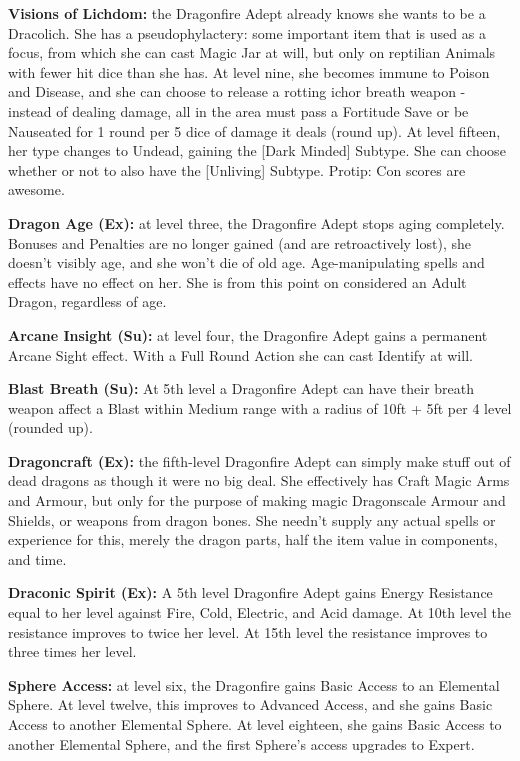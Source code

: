 \begin{itemize*}
\item \textbf{Visions of Lichdom:} the Dragonfire Adept already knows she wants to be a Dracolich. She has a pseudophylactery: some important item that is used as a focus, from which she can cast Magic Jar at will, but only on reptilian Animals with fewer hit dice than she has. At level nine, she becomes immune to Poison and Disease, and she can choose to release a rotting ichor breath weapon - instead of dealing damage, all in the area must pass a Fortitude Save or be Nauseated for 1 round per 5 dice of damage it deals (round up). At level fifteen, her type changes to Undead, gaining the [Dark Minded] Subtype. She can choose whether or not to also have the [Unliving] Subtype. Protip: Con scores are awesome.
\end{itemize*}

\textbf{Dragon Age (Ex):} at level three, the Dragonfire Adept stops aging completely. Bonuses and Penalties are no longer gained (and are retroactively lost), she doesn't visibly age, and she won't die of old age. Age-manipulating spells and effects have no effect on her. She is from this point on considered an Adult Dragon, regardless of age.

\textbf{Arcane Insight (Su):} at level four, the Dragonfire Adept gains a permanent Arcane Sight effect. With a Full Round Action she can cast Identify at will.

\textbf{Blast Breath (Su):} At 5th level a Dragonfire Adept can have their breath weapon affect a Blast within Medium range with a radius of 10ft + 5ft per 4 level (rounded up).

\textbf{Dragoncraft (Ex):} the fifth-level Dragonfire Adept can simply make stuff out of dead dragons as though it were no big deal. She effectively has Craft Magic Arms and Armour, but only for the purpose of making magic Dragonscale Armour and Shields, or weapons from dragon bones. She needn't supply any actual spells or experience for this, merely the dragon parts, half the item value in components, and time.

\textbf{Draconic Spirit (Ex):} A 5th level Dragonfire Adept gains Energy Resistance equal to her level against Fire, Cold, Electric, and Acid damage. At 10th level the resistance improves to twice her level. At 15th level the resistance improves to three times her level.

\textbf{Sphere Access:} at level six, the Dragonfire gains Basic Access to an Elemental Sphere. At level twelve, this improves to Advanced Access, and she gains Basic Access to another Elemental Sphere. At level eighteen, she gains Basic Access to another Elemental Sphere, and the first Sphere's access upgrades to Expert.

